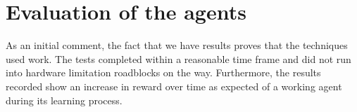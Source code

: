 \section{Evaluation of the agents }
\label{sec:eval_of_agents}


As an initial comment, the fact that we have results proves that the techniques used work. The tests completed within a reasonable time frame and did not run into hardware limitation roadblocks on the way. Furthermore, the results recorded show an increase in reward over time as expected of a working agent during its learning process. 






